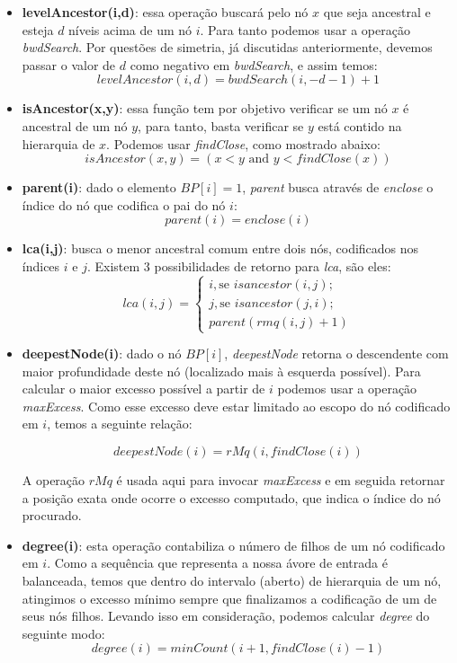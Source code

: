 \begin{itemize}
        \item  \textbf{levelAncestor(i,d)}: essa operação buscará pelo nó $x$ que seja ancestral e esteja $d$ níveis acima de um nó $i$. Para tanto podemos usar a operação \textit{bwdSearch}. Por questões de simetria, já discutidas anteriormente, devemos passar o valor de $d$ como negativo em \textit{bwdSearch}, e assim temos:
        $$levelAncestor(i,d) = bwdSearch(i,-d-1)+1$$
        
        \item \textbf{isAncestor(x,y)}: essa função tem por objetivo verificar se um nó $x$ é ancestral de um nó $y$, para tanto, basta verificar se $y$ está contido na hierarquia de $x$. Podemos usar \textit{findClose}, como mostrado abaixo:
        $$ isAncestor(x,y) = (x < y  \mbox{ and }  y < findClose(x))$$
        
        \item \textbf{parent(i)}: dado o elemento $BP[i]=1$, \textit{parent} busca através de \textit{enclose} o índice do nó que codifica
        o pai do nó $i$:
        $$parent(i) = enclose(i)$$
        
        \item \textbf{lca(i,j)}: busca o menor ancestral comum entre dois nós, codificados nos índices $i$ e $j$. Existem 3 possibilidades de retorno para \textit{lca}, são eles:
        $$lca(i,j) =
               \begin{cases}
                     i,  \mbox{se } isancestor(i,j); \\
                    j, \mbox{se } isancestor(j,i); \\
                    parent(rmq(i ,j)+1)
               \end{cases}
        $$

        \item \textbf{deepestNode(i)}: dado o nó  $BP[i]$, \textit{deepestNode} retorna o descendente com maior profundidade deste nó (localizado mais à esquerda possível). Para calcular o maior excesso possível a partir de $i$ podemos usar a operação \textit{maxExcess}. Como esse excesso deve estar limitado ao escopo do nó codificado em $i$, temos a seguinte relação:

        $$deepestNode(i) = rMq(i, findClose(i))$$

        A operação $rMq$ é usada aqui para invocar \textit{maxExcess} e em seguida retornar a posição exata onde ocorre o excesso computado, que indica o índice do nó procurado.

        \item \textbf{degree(i)}: esta operação contabiliza o número de filhos de um nó codificado em $i$. Como a sequência que representa a nossa ávore de entrada é balanceada, temos que dentro do intervalo (aberto) de hierarquia de um nó, atingimos o excesso mínimo sempre que finalizamos a codificação de um de seus nós filhos. Levando isso em consideração, podemos calcular \textit{degree} do seguinte modo:
        $$degree(i) = minCount(i+1, findClose(i)-1)$$
        

\end{itemize}
